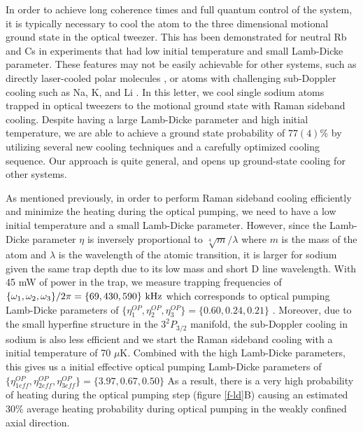\documentclass[aps,prl,twocolumn,groupedaddress]{revtex4-1}
\begin{document}
In order to achieve long coherence times and full quantum control of the system,
it is typically necessary to cool the atom to the
three dimensional motional ground state in the optical tweezer.
This has been demonstrated for neutral Rb\cite{Thompson2013,Kaufman2012} and Cs  in experiments that had low initial temperature and small Lamb-Dicke parameter.
These features
may not be easily achievable for other systems, such as directly laser-cooled polar molecules ,
or atoms with challenging sub-Doppler cooling such as Na, K, and Li .
In this letter, we cool single sodium atoms
trapped in optical tweezers to the motional ground state with Raman sideband cooling.
Despite having a large Lamb-Dicke parameter and high initial temperature, we are able to achieve a ground state probability of $77(4)\%$
by utilizing several new cooling techniques and a carefully optimized cooling sequence.  Our approach is quite general, and opens up ground-state cooling for other systems.

As mentioned previously, in order to perform Raman sideband cooling efficiently and
minimize the heating during the optical pumping, we need to have a low initial temperature and
a small Lamb-Dicke parameter. However, since the Lamb-Dicke parameter $\eta$ is inversely
proportional to $\sqrt[4]{m}/\lambda$ where $m$ is the mass of the atom and $\lambda$
is the wavelength of the atomic transition,
it is larger for sodium given the same trap depth due to its low mass and short D line wavelength.
With 45 mW of power in the trap, we measure trapping frequencies of
$\{\omega_1,\omega_2,\omega_3\}/2\pi = \{69, 430, 590\}\ \text{\text{kHz}}$ 
which corresponds to optical pumping Lamb-Dicke parameters of
$\{\eta^{OP}_1,\eta^{OP}_2,\eta^{OP}_3\} = \{0.60, 0.24, 0.21\}$ .
Moreover, due to the small hyperfine structure in the $3^2P_{3/2}$ manifold,
the sub-Doppler cooling in sodium is also less efficient and we start the
Raman sideband cooling with a initial temperature of 70 $\mu$K. Combined with the high Lamb-Dicke
parameters, this gives us a initial effective optical pumping Lamb-Dicke parameters of
$\{\eta^{OP}_{1eff},\eta^{OP}_{2eff},\eta^{OP}_{3eff}\} = \{3.97, 0.67, 0.50\}$
As a result, there is a very high probability of heating during the optical pumping step
(figure \ref{f-ld}B) causing an estimated $30\%$ average heating probability during optical pumping
in the weakly confined axial direction.
\end{document}
